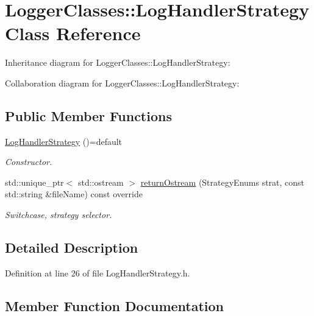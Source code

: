 \hypertarget{classLoggerClasses_1_1LogHandlerStrategy}{}\section{Logger\+Classes\+::Log\+Handler\+Strategy Class Reference}
\label{classLoggerClasses_1_1LogHandlerStrategy}


Inheritance diagram for Logger\+Classes\+::Log\+Handler\+Strategy\+:


Collaboration diagram for Logger\+Classes\+::Log\+Handler\+Strategy\+:
\subsection*{Public Member Functions}
\begin{DoxyCompactItemize}
\item 
\mbox{\label{classLoggerClasses_1_1LogHandlerStrategy_a760c531109f6c85bc6b172cf2c977ff4}} 
\mbox{\hyperlink{classLoggerClasses_1_1LogHandlerStrategy_a760c531109f6c85bc6b172cf2c977ff4}{Log\+Handler\+Strategy}} ()=default
\begin{DoxyCompactList}\small\item\em Constructor. \end{DoxyCompactList}\item 
std\+::unique\+\_\+ptr$<$ std\+::ostream $>$ \mbox{\hyperlink{classLoggerClasses_1_1LogHandlerStrategy_ab7f8e83edb42c81b9b416018f1c0cfb2}{return\+Ostream}} (Strategy\+Enums strat, const std\+::string \&file\+Name) const override
\begin{DoxyCompactList}\small\item\em Switchcase, strategy selector. \end{DoxyCompactList}\end{DoxyCompactItemize}


\subsection{Detailed Description}


Definition at line 26 of file Log\+Handler\+Strategy.\+h.



\subsection{Member Function Documentation}
\mbox{\label{classLoggerClasses_1_1LogHandlerStrategy_ab7f8e83edb42c81b9b416018f1c0cfb2}} 
